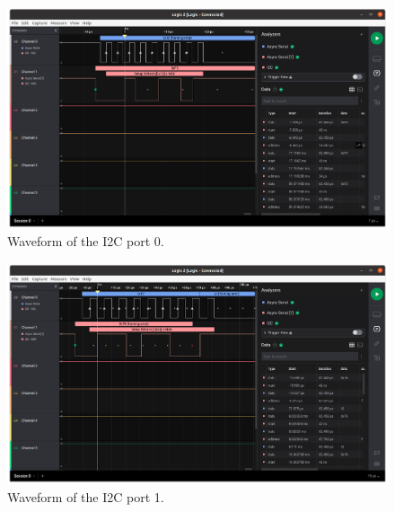 \begin{figure}[!ht]
    \begin{center}
        \includegraphics[width=\columnwidth]{figures/v07/obdh2-pl-i2c.png}
        \caption{Waveform of the I2C port 0.}
        \label{fig:v07-test-i2c-0}
    \end{center}
\end{figure}

\begin{figure}[!ht]
    \begin{center}
        \includegraphics[width=\columnwidth]{figures/v07/obdh2-eps-i2c.png}
        \caption{Waveform of the I2C port 1.}
        \label{fig:v07-test-i2c-1}
    \end{center}
\end{figure}

